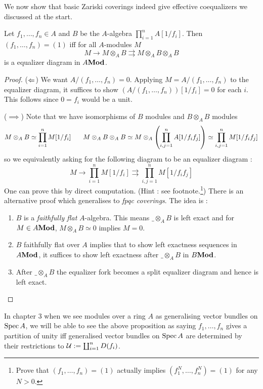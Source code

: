 \documentclass[./main.tex]{subfiles}
\begin{document}
We now show that basic Zariski coverings indeed give effective coequalizers
we discussed at the start.
\begin{prop}
  
  Let $f_1 , \dots , f_n \in A$ and $B$ be the $A$-algebra
  $\prod_{i = 1}^n A[1/f_i]$.
  Then $(f_1 , \dots , f_n) = (1)$ iff
  for all $A$-modules $M$
  \[
  M \to M \otimes_A B \rightrightarrows 
  M \otimes_A B \otimes_A B
  \]
  is a equalizer diagram in $A\mathbf{Mod}$.
\end{prop}
\begin{proof}
  ($\Leftarrow$) We want $A / (f_1 ,\dots , f_n) = 0$.
  Applying $M = A / (f_1 ,\dots , f_n)$ to the equalizer diagram,
  it suffices to show $(A / (f_1 ,\dots , f_n))[1 / f_i] = 0$ for each $i$.
  This follows since $0 = f_i$ would be a unit.

  ($\implies$) Note that we have isomorphisms of $B$ modules
  and $B \otimes_A B$ modules
  \[
    M \otimes_A B \simeq \prod_{i = 1}^n M[1 / f_i] \,\,\,\,\,\,\,\,\,\,\,
    M \otimes_A B \otimes_A B
    \simeq M \otimes_A \left(
      \prod_{i , j = 1}^n A [1 / f_i f_j]  
    \right)
    \simeq \prod_{i , j = 1}^n M[1 / f_i f_j]  
  \]
  so we equivalently asking for the following diagram to be an equalizer diagram :
  \[
    M \to \prod_{i = 1}^n M[1 / f_i] \rightrightarrows \prod_{i , j = 1}^n M[1 / f_i f_j]  
  \]
  One can prove this by direct computation. (Hint : see footnote.\footnote{
    Prove that $(f_1 , \dots , f_n) = (1)$
    actually implies $(f_1^N , \dots , f_n^N) = (1)$ 
    for any $N > 0$.
  })
  There is an alternative proof which generalises to \emph{fpqc coverings}.
  The idea is : 
  \begin{enumerate}
    \item $B$ is a \emph{faithfully flat} $A$-algebra.
    This means $\_ \otimes_A B$ is left exact and 
    for $M \in A\mathbf{Mod}$, $M \otimes_A B \simeq 0$ implies $M = 0$.
    \item $B$ faithfully flat over $A$ implies
    that to show left exactness sequences in $A\mathbf{Mod}$,
    it suffices to show left exactness after $\_ \otimes_A B$ in $B\mathbf{Mod}$.
    \item After $\_ \otimes_A B$ the equalizer fork
    becomes a split equalizer diagram
    and hence is left exact.
  \end{enumerate}
\end{proof}

In chapter 3 when we see modules over a ring $A$
as generalising vector bundles on $\operatorname{Spec} A$,
we will be able to see the above proposition as saying
$f_1 , \dots , f_n$ gives a partition of unity
iff generalised vector bundles on $\operatorname{Spec} A$
are determined by their restrictions to
$\mathcal{U} := \coprod_{i = 1}^n D(f_i)$.
\end{document}
